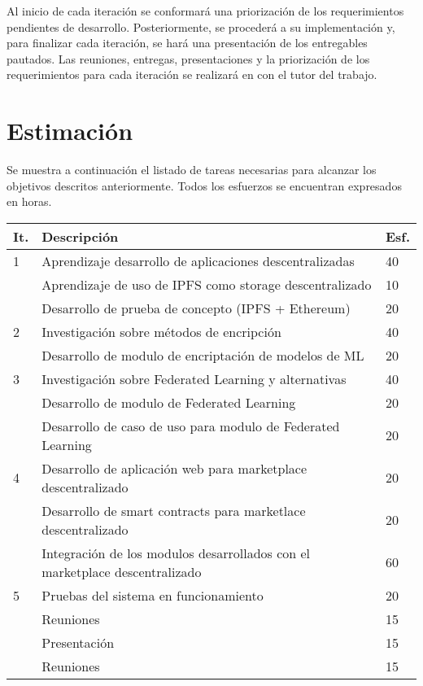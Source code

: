 \documentclass[
11pt, %
spanish, %
singlespacing, %
headsepline, %
]{MastersDoctoralThesis} %
\begin{document}
Al inicio de cada iteración se conformará una priorización de los requerimientos pendientes de desarrollo. Posteriormente, se procederá a su implementación y, para finalizar cada iteración, se hará una presentación de los entregables pautados. Las reuniones, entregas, presentaciones y la priorización de los requerimientos para cada iteración se realizará en con el tutor del trabajo.



\section{Estimaci\'on}

Se muestra a continuación el listado de tareas necesarias para alcanzar los objetivos descritos anteriormente. Todos los esfuerzos se encuentran expresados en horas.

{
\setlength{\extrarowheight}{.2em}
\begin{center}
	\begin{tabularx}{\textwidth}{|l|X|l|}
    \hline
    \textbf{It.} & \textbf{Descripción} & \textbf{Esf.}  \\ \hline
    1 & Aprendizaje desarrollo de aplicaciones descentralizadas & 40 \\ 
      & Aprendizaje de uso de IPFS como storage descentralizado & 10 \\
      & Desarrollo de prueba de concepto (IPFS + Ethereum) & 20 \\ \hline
    2 & Investigación sobre métodos de encripción & 40 \\
      & Desarrollo de modulo de encriptación de modelos de ML & 20 \\ \hline
    3 & Investigación sobre Federated Learning y alternativas & 40 \\ 
      & Desarrollo de modulo de Federated Learning & 20 \\ 
      & Desarrollo de caso de uso para modulo de Federated Learning & 20 \\ \hline
    4 & Desarrollo de aplicación web para marketplace descentralizado & 20 \\ 
      & Desarrollo de smart contracts para marketlace descentralizado & 20 \\ 
      & Integración de los modulos desarrollados con el marketplace descentralizado & 60 \\ \hline     
    5  & Pruebas del sistema en funcionamiento & 20 \\ \hline
      & Reuniones & 15 \\ \hline
      & Presentación & 15 \\ \hline
      & Reuniones & 15 \\ \hline
    \end{tabularx}
\end{center}
}
\end{document}
